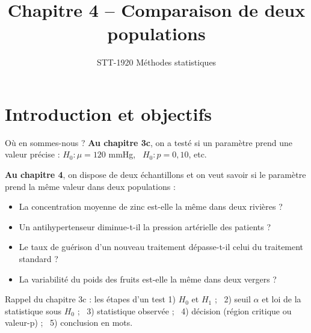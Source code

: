 \documentclass{BeamerTemplate}
\title{Chapitre 4 -- Comparaison de deux populations}
\subtitle{STT-1920 Méthodes statistiques}
\date{}
\begin{document}
\begin{frame}[t]
  \titlepage
\end{frame}

\section{Introduction et objectifs}

\begin{frame}[t]{Où en sommes-nous ?}
  \textbf{Au chapitre 3c}, on a testé si \alert{un} paramètre prend une valeur précise :
  $H_0: \mu = 120$ mmHg, \ $H_0: p = 0{,}10$, etc.

  \medskip
  \textbf{Au chapitre 4}, on dispose de \alert{deux échantillons} et on veut savoir si le paramètre prend la \alert{même valeur dans deux populations} :
  \begin{itemize}\itemsep 1mm
    \item La concentration moyenne de zinc est-elle la même dans deux rivières ?
    \item Un antihypertenseur diminue-t-il la pression artérielle des patients ?
    \item Le taux de guérison d'un nouveau traitement dépasse-t-il celui du traitement standard ?
    \item La variabilité du poids des fruits est-elle la même dans deux vergers ?
  \end{itemize}

  \begin{Boite}{Rappel du chapitre 3c : les étapes d'un test}
    \small
    1) $H_0$ et $H_1$ ; \ 2) seuil $\alpha$ et loi de la statistique sous $H_0$ ; \ 3) statistique observée ; \ 4) décision (région critique ou valeur-p) ; \ 5) \alert{conclusion en mots}.
  \end{Boite}
\end{frame}
\end{document}
